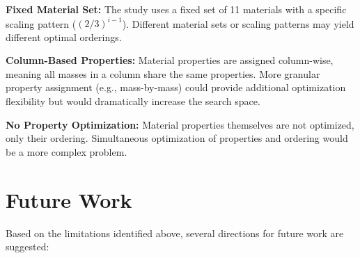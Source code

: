 \documentclass[11pt,a4paper]{article}
\begin{document}
\noindent \textbf{Fixed Material Set:} The study uses a fixed set of 11 materials with a specific scaling pattern ($(2/3)^{i-1}$). Different material sets or scaling patterns may yield different optimal orderings. \newline

\noindent \textbf{Column-Based Properties:} Material properties are assigned column-wise, meaning all masses in a column share the same properties. More granular property assignment (e.g., mass-by-mass) could provide additional optimization flexibility but would dramatically increase the search space. \newline

\noindent \textbf{No Property Optimization:} Material properties themselves are not optimized, only their ordering. Simultaneous optimization of properties and ordering would be a more complex problem.

\section{Future Work}

\noindent Based on the limitations identified above, several directions for future work are suggested:
\end{document}
